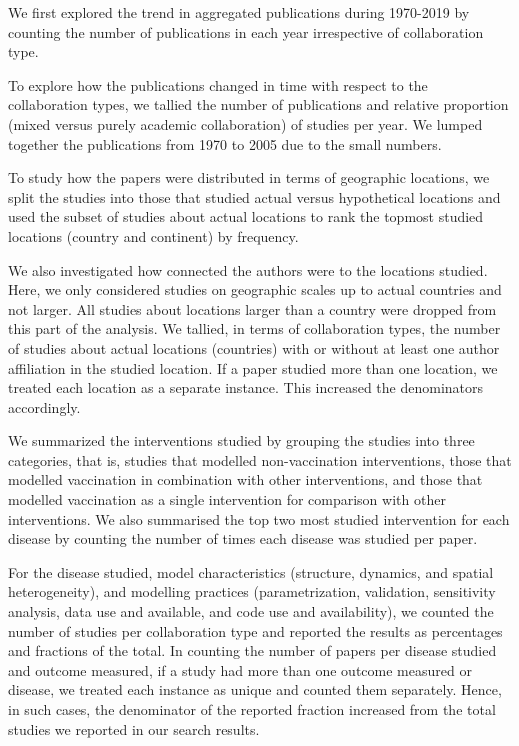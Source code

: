 \documentclass[10pt,letterpaper]{article}
\begin{document}
We first explored the trend in aggregated publications during 1970-2019 by counting the number of publications in each year irrespective of collaboration type. 

To explore how the publications changed in time with respect to the collaboration types, we tallied the number of publications and relative proportion (mixed versus purely academic collaboration) of studies per year. We lumped together the publications from 1970 to 2005 due to the small numbers. 

To study how the papers were distributed in terms of geographic locations, we split the studies into those that studied actual versus hypothetical locations and used the subset of studies about actual locations to rank the topmost studied locations (country and continent) by frequency. 

We also investigated how connected the authors were to the locations studied. Here, we only considered studies on geographic scales up to actual countries and not larger. All studies about locations larger than a country were dropped from this part of the analysis. We tallied, in terms of collaboration types, the number of studies about actual locations (countries) with or without at least one author affiliation in the studied location. If a paper studied more than one location, we treated each location as a separate instance. This increased the denominators accordingly. 

We summarized the interventions studied by grouping the studies into three categories, that is, studies that modelled non-vaccination interventions, those that modelled vaccination in combination with other interventions, and those that modelled vaccination as a single intervention for comparison with other interventions. We also summarised the top two most studied intervention for each disease by counting the number of times each disease was studied per paper. 

For the disease studied, model characteristics (structure, dynamics, and spatial heterogeneity), and modelling practices (parametrization, validation, sensitivity analysis, data use and available, and code use and availability), we counted the number of studies per collaboration type and reported the results as percentages and fractions of the total. In counting the number of papers per disease studied and outcome measured, if a study had more than one outcome measured or disease, we treated each instance as unique and counted them separately. Hence, in such cases, the denominator of the reported fraction increased from the total studies we reported in our search results. 
\end{document}
